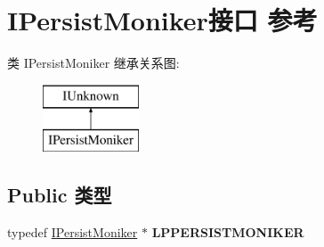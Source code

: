 \hypertarget{interface_i_persist_moniker}{}\section{I\+Persist\+Moniker接口 参考}
\label{interface_i_persist_moniker}
类 I\+Persist\+Moniker 继承关系图\+:\begin{figure}[H]
\begin{center}
\leavevmode
\includegraphics[height=2.000000cm]{interface_i_persist_moniker}
\end{center}
\end{figure}
\subsection*{Public 类型}
\begin{DoxyCompactItemize}
\item 
\mbox{\label{interface_i_persist_moniker_ad662a90887a7573abfd3c6df2a31609e}} 
typedef \hyperlink{interface_i_persist_moniker}{I\+Persist\+Moniker} $\ast$ {\bfseries L\+P\+P\+E\+R\+S\+I\+S\+T\+M\+O\+N\+I\+K\+ER}
\end{DoxyCompactItemize}
